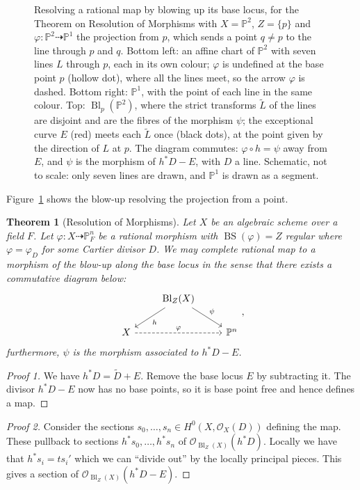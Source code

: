 \documentclass[12pt]{article}
\numberwithin{equation}{section}
\newtheorem{theorem}{Theorem}[subsection]
\theoremstyle{definition}
\theoremstyle{remark}
\newcommand{\Ocal}{\mathcal{O}}
\newcommand{\PP}{\mathbb{P}}
\newcommand{\Bl}{\operatorname{Bl}}
\newcommand{\BS}{\operatorname{BS}}
\begin{document}
\begin{figure}[H]
\centering

\caption{Resolving a rational map by blowing up its base locus, for the Theorem on Resolution of Morphisms with $X=\PP^2$, $Z=\{p\}$ and $\varphi\colon\PP^2\dashrightarrow\PP^1$ the projection from $p$, which sends a point $q\neq p$ to the line through $p$ and $q$. Bottom left: an affine chart of $\PP^2$ with seven lines $L$ through $p$, each in its own colour; $\varphi$ is undefined at the base point $p$ (hollow dot), where all the lines meet, so the arrow $\varphi$ is dashed. Bottom right: $\PP^1$, with the point of each line in the same colour. Top: $\Bl_p(\PP^2)$, where the strict transforms $\widetilde L$ of the lines are disjoint and are the fibres of the morphism $\psi$; the exceptional curve $E$ (red) meets each $\widetilde L$ once (black dots), at the point given by the direction of $L$ at $p$. The diagram commutes: $\varphi\circ h=\psi$ away from $E$, and $\psi$ is the morphism of $h^*D-E$, with $D$ a line. Schematic, not to scale: only seven lines are drawn, and $\PP^1$ is drawn as a segment.}\label{fig:resolve-projection}
\end{figure}
Figure~\ref{fig:resolve-projection} shows the blow-up resolving the projection from a point.

\begin{theorem}[Resolution of Morphisms]
	Let $X$ be an algebraic scheme over a field $F$.
	Let $\varphi: X \dashrightarrow \PP^n_F$ be a rational morphism with $\BS(\varphi)=Z$ regular where $\varphi = \varphi_{D}$ for some Cartier divisor $D$. 
	We may complete rational map to a morphism of the blow-up along the base locus in the sense that there exists a commutative diagram below:
	$$ 
	\begin{tikzcd}
	& \Bl_Z(X) \ar[dr,"\psi"] \ar[dl, "h"] &\\
	X \ar[rr,dashed,"\varphi"] & & \PP^n
	\end{tikzcd},
	$$ 
	furthermore, $\psi$ is the morphism associated to $h^*D-E$.
\end{theorem}
\begin{proof}[Proof 1]
	We have $h^*D = \widetilde{D}+E$.
	Remove the base locus $E$ by subtracting it. 
	The divisor $h^*D-E$ now has no base points, so it is base point free and hence defines a map.
\end{proof}
\begin{proof}[Proof 2]
	Consider the sections $s_0,\ldots,s_n \in H^0(X,\Ocal_X(D))$ defining the map. 
	These pullback to sections $h^*s_0,\ldots, h^*s_n$ of $\Ocal_{\Bl_Z(X)}(h^*D)$. 
	Locally we have that $h^*s_i = t s_i'$ which we can ``divide out'' by the locally principal pieces.  
	This gives a section of $\Ocal_{\Bl_Z(X)}(h^*D-E)$.
\end{proof}
\end{document}
